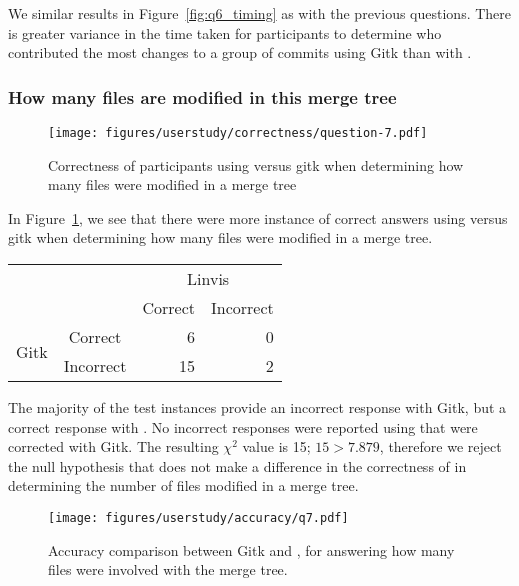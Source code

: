We similar results in Figure~\ref{fig:q6_timing} as with the previous
questions. There is greater variance in the time taken for participants
to determine who contributed the most changes to a group of commits
using Gitk than with \tool.

\subsubsection{How many files are modified in this merge tree}
\label{ssub:how_many_files_were_modified_in_this_merge_tree}

\begin{figure}[htpb]
  \centering
  \texttt{[image: figures/userstudy/correctness/question-7.pdf]}
  \caption{Correctness of participants using \tool versus gitk when
    determining how many files were modified in a merge tree}
  \label{fig:q_7_correctness}
\end{figure}

In Figure~\ref{fig:q_7_correctness}, we see that there were more
instance of correct answers using \tool versus gitk when determining how
many files were modified in a merge tree.

\begin{center}
  \begin{tabular}{cc|rr}
                           &           & \multicolumn{2}{c}{Linvis}\\
                           &           & Correct                      & Incorrect\\\hline
    \multirow{2}{*}{Gitk}  & Correct   & 6                            & 0\\
                           & Incorrect & 15                           & 2\\
  \end{tabular}
\end{center}

The majority of the test instances provide an incorrect response with
Gitk, but a correct response with \tool. No incorrect responses were
reported using \tool that were corrected with Gitk. The resulting
$\chi^2$ value is 15; $15 > 7.879$, therefore we reject the null
hypothesis that \tool does not make a difference in the correctness of
in determining the number of files modified in a merge tree.

\begin{figure}[htpb]
  \centering
  \texttt{[image: figures/userstudy/accuracy/q7.pdf]}
  \caption{Accuracy comparison between Gitk and \tool, for answering how
  many files were involved with the merge tree.}
  \label{fig:q7_accuracy}
\end{figure}

